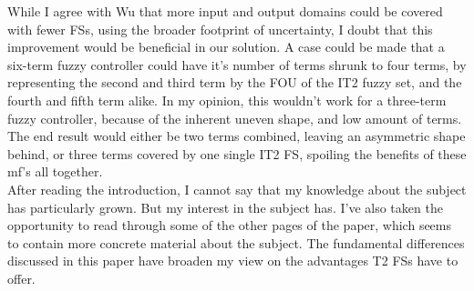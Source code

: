 While I agree with Wu that more input and output domains could be covered with fewer FSs, using the broader footprint of uncertainty, I doubt that this improvement would be beneficial in our solution. A case could be made that a six-term fuzzy controller could have it's number of terms shrunk to four terms, by representing the second and third term by the FOU of the IT2 fuzzy set, and the fourth and fifth term alike. In my opinion, this wouldn't work for a three-term fuzzy controller, because of the inherent uneven shape, and low amount of terms. The end result would either be two terms combined, leaving an asymmetric shape behind, or three terms covered by one single IT2 FS, spoiling the benefits of these mf's all together. \\

After reading the introduction, I cannot say that my knowledge about the subject has particularly grown. But my interest in the subject has. I've also taken the opportunity to read through some of the other pages of the paper, which seems to contain more concrete material about the subject.
The fundamental differences discussed in this paper have broaden my view on the advantages T2 FSs have to offer.
